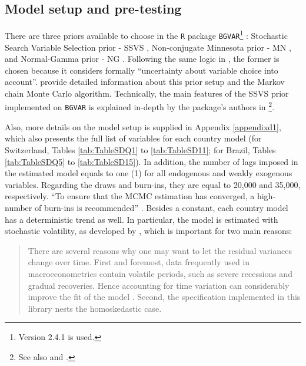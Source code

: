 \documentclass[a4paper, twoside]{templates/ociamthesis}
\begin{document}
\hypertarget{fivetwothree}{%
\subsection{Model setup and pre-testing}\label{fivetwothree}}

There are three priors available to choose in the \texttt{R} package \texttt{BGVAR}\footnote{Version 2.4.1 is used.} \autocite{bock2021}: Stochastic Search Variable Selection prior - SSVS \autocite{george1993,george2008}, Non-conjugate Minnesota prior - MN \autocite{litterman1986,koop2010}, and Normal-Gamma prior - NG \autocite{huber2019}. Following the same logic in \textcite[ 170]{feldkircher2016}, the former is chosen because it considers formally ``uncertainty about variable choice into account''. \textcite[ 11-12]{feldkircher2020} provide detailed information about this prior setup and the Markov chain Monte Carlo algorithm. Technically, the main features of the SSVS prior implemented on \texttt{BGVAR} is explained in-depth by the package's authors in \textcite[ 4-6]{bock2020}\footnote{See also \textcite[ 1377-1378]{cuaresma2016} and \textcite[ 170-171]{feldkircher2016}.}.

Also, more details on the model setup is supplied in Appendix \ref{appendixd1}, which also presents the full list of variables for each country model (for Switzerland, Tables \ref{tab:TableSDQ1} to \ref{tab:TableSD11}; for Brazil, Tables \ref{tab:TableSDQ5} to \ref{tab:TableSD15}). In addition, the number of lags imposed in the estimated model equals to one (1) for all endogenous and weakly exogenous variables. Regarding the draws and burn-ins, they are equal to 20,000 and 35,000, respectively. ``To ensure that the MCMC estimation has converged, a high-number of burn-ins is recommended'' \autocite[ 9]{bock2020}. Besides a constant, each country model has a deterministic trend as well. In particular, the model is estimated with stochastic volatility, as developed by \textcite{kastner2016}, which is important for two main reasons:

\begin{quote}
There are several reasons why one may want to let the residual variances change over time. First and foremost, data frequently used in macroeconometrics contain volatile periods, such as severe recessions and gradual recoveries. Hence accounting for time variation can considerably improve the fit of the model \autocite{primiceri2005,sims2006,dovern2016,huber2016}. Second, the specification implemented in this library nests the homoskedastic case. \autocite[ 10]{bock2020}
\end{quote}
\end{document}
